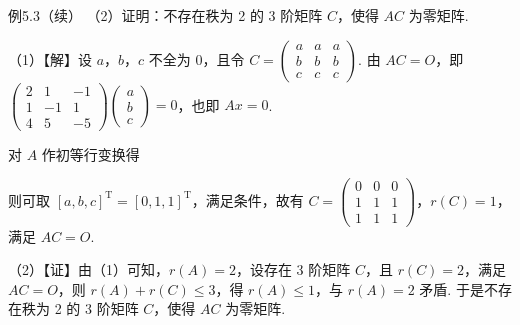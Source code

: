 \begin{fcard}{例5.3（续）}
（2）证明：不存在秩为 2 的 3 阶矩阵 $C$，使得 $AC$ 为零矩阵.

（1）【解】设 $a$，$b$，$c$ 不全为 0，且令 $C=\begin{pmatrix}a&a&a\\b&b&b\\c&c&c\end{pmatrix}$. 由 $AC=O$，即 $\begin{pmatrix}2&1&-1\\1&-1&1\\4&5&-5\end{pmatrix}\begin{pmatrix}a\\b\\c\end{pmatrix}=0$，也即 $Ax=0$.

对 $A$ 作初等行变换得


则可取 $[a,b,c]^{\mathrm T}=[0,1,1]^{\mathrm T}$，满足条件，故有 $C=\begin{pmatrix}0&0&0\\1&1&1\\1&1&1\end{pmatrix}$，$r(C)=1$，满足 $AC=O$.

（2）【证】由（1）可知，$r(A)=2$，设存在 3 阶矩阵 $C$，且 $r(C)=2$，满足 $AC=O$，则 $r(A)+r(C)\le3$，得 $r(A)\le1$，与 $r(A)=2$ 矛盾. 于是不存在秩为 2 的 3 阶矩阵 $C$，使得 $AC$ 为零矩阵.
\end{fcard}

